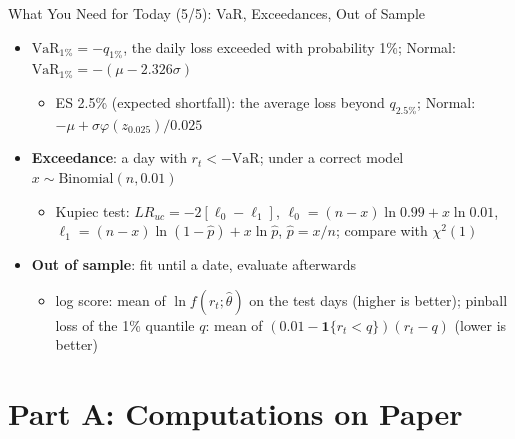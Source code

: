 \begin{frame}{What You Need for Today (5/5): VaR, Exceedances, Out of Sample}
\itemsize{\footnotesize}
\begin{itemize}
    \item $\mathrm{VaR}_{1\%} = -q_{1\%}$, the daily loss exceeded with probability 1\%; Normal: $\mathrm{VaR}_{1\%} = -(\mu - 2.326\sigma)$
    \begin{itemize}
        \item ES 2.5\% (expected shortfall): the average loss beyond $q_{2.5\%}$; Normal: $-\mu + \sigma\varphi(z_{0.025})/0.025$
    \end{itemize}
    \item \textbf{Exceedance}: a day with $r_t < -\mathrm{VaR}$; under a correct model $x \sim \mathrm{Binomial}(n, 0.01)$
    \begin{itemize}
        \item Kupiec test: $LR_{uc} = -2[\ell_0 - \ell_1]$, $\ell_0 = (n - x)\ln 0.99 + x\ln 0.01$, $\ell_1 = (n - x)\ln(1 - \hat p) + x\ln\hat p$, $\hat p = x/n$; compare with $\chi^2(1)$
    \end{itemize}
    \item \textbf{Out of sample}: fit until a date, evaluate afterwards
    \begin{itemize}
        \item log score: mean of $\ln f(r_t; \hat\theta)$ on the test days (higher is better); pinball loss of the 1\% quantile $q$: mean of $(0.01 - \mathbf{1}\{r_t < q\})(r_t - q)$ (lower is better)
    \end{itemize}
\end{itemize}
\end{frame}


\section{Part A: Computations on Paper}


